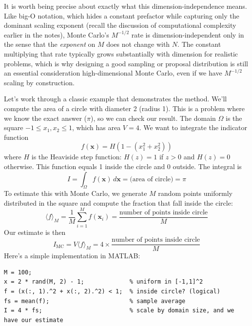 It is worth being precise about exactly what this dimension-independence means. Like big-O notation, which hides a constant prefactor while capturing only the dominant scaling exponent (recall the discussion of computational complexity earlier in the notes), Monte Carlo's $M^{-1/2}$ rate is dimension-independent only in the sense that the \emph{exponent} on $M$ does not change with $N$. The constant multiplying that rate typically grows substantially with dimension for realistic problems, which is why designing a good sampling or proposal distribution is still an essential consideration high-dimensional Monte Carlo, even if we have $M^{-1/2}$ scaling by construction.

Let's work through a classic example that demonstrates the method. We'll compute the area of a circle with diameter 2 (radius 1). This is a problem where we know the exact answer ($\pi$), so we can check our result. The domain $\Omega$ is the square $-1 \leq x_1, x_2 \leq 1$, which has area $V = 4$. We want to integrate the indicator function
\begin{equation}
    f(\mathbf{x}) = H(1 - (x_1^2 + x_2^2))
\end{equation}
where $H$ is the Heaviside step function: $H(z) = 1$ if $z > 0$ and $H(z) = 0$ otherwise. This function equals 1 inside the circle and 0 outside. The integral is
\begin{equation}
    I = \int_{\Omega} f(\mathbf{x}) \, d\mathbf{x} = \text{(area of circle)} = \pi
\end{equation} 
To estimate this with Monte Carlo, we generate $M$ random points uniformly distributed in the square and compute the fraction that fall inside the circle:
\begin{equation}
    \langle f \rangle_M = \frac{1}{M} \sum_{i=1}^{M} f(\mathbf{x}_i) = \frac{\text{number of points inside circle}}{M}
\end{equation}
Our estimate is then
\begin{equation}
    I_{\text{MC}} = V \langle f \rangle_M = 4 \times \frac{\text{number of points inside circle}}{M}
\end{equation}
Here's a simple implementation in MATLAB:
\begin{verbatim}
M = 100;
x = 2 * rand(M, 2) - 1;             % uniform in [-1,1]^2
f = (x(:, 1).^2 + x(:, 2).^2) < 1;  % inside circle? (logical)
fs = mean(f);                       % sample average
I = 4 * fs;                         % scale by domain size, and we have our estimate
\end{verbatim}
